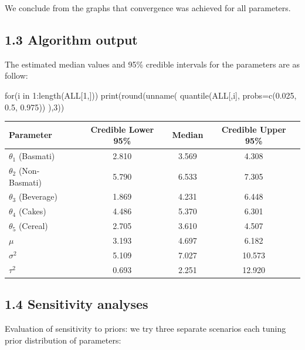 \documentclass[]{article}
\newenvironment{Shaded}{\begin{snugshade}}{\end{snugshade}}
\newcommand{\KeywordTok}[1]{\textcolor[rgb]{0.94,0.87,0.69}{{#1}}}
\newcommand{\DataTypeTok}[1]{\textcolor[rgb]{0.87,0.87,0.75}{{#1}}}
\newcommand{\DecValTok}[1]{\textcolor[rgb]{0.86,0.86,0.80}{{#1}}}
\newcommand{\FloatTok}[1]{\textcolor[rgb]{0.75,0.75,0.82}{{#1}}}
\newcommand{\NormalTok}[1]{\textcolor[rgb]{0.80,0.80,0.80}{{#1}}}
\begin{document}
We conclude from the graphs that convergence was achieved for all
parameters.

\subsection{1.3 Algorithm output}

The estimated median values and 95\% credible intervals for the
parameters are as follow:

\begin{Shaded}
\begin{Highlighting}[]
  \NormalTok{for(i in }\DecValTok{1}\NormalTok{:}\KeywordTok{length}\NormalTok{(ALL[}\DecValTok{1}\NormalTok{,])) }\KeywordTok{print}\NormalTok{(}\KeywordTok{round}\NormalTok{(}\KeywordTok{unname}\NormalTok{(}
    \KeywordTok{quantile}\NormalTok{(ALL[,i], }\DataTypeTok{probs=}\KeywordTok{c}\NormalTok{(}\FloatTok{0.025}\NormalTok{, }\FloatTok{0.5}\NormalTok{, }\FloatTok{0.975}\NormalTok{))}
    \NormalTok{),}\DecValTok{3}\NormalTok{))}
\end{Highlighting}
\end{Shaded}

\begin{center}
  \begin{tabular}{l c c c}
  \hline Parameter & Credible Lower 95\% & Median & Credible Upper 95\%  \\ \hline
    $\theta_1$ (Basmati) & 2.810 & 3.569 & 4.308 \\ 
    $\theta_2$ (Non-Basmati) & 5.790 & 6.533 & 7.305 \\
    $\theta_3$ (Beverage) & 1.869 & 4.231 & 6.448 \\
    $\theta_4$ (Cakes) & 4.486 & 5.370 & 6.301 \\
    $\theta_5$ (Cereal) & 2.705 & 3.610 & 4.507 \\
    $\mu$ & 3.193 & 4.697 & 6.182 \\
    $\sigma^2$ & 5.109 & 7.027 & 10.573 \\
    $\tau^2$ & 0.693 &2.251 & 12.920 \\ \hline
  \end{tabular}
\end{center}

\subsection{1.4 Sensitivity analyses}

Evaluation of sensitivity to priors: we try three separate scenarios
each tuning prior distribution of parameters:
\end{document}
